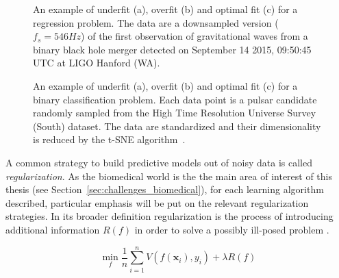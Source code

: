     \begin{figure}[!h]
    	\centering
        \hfill%
    	\caption{An example of underfit (a), overfit (b) and optimal fit (c) for a regression problem. The data are a downsampled version ($f_s = 546 Hz$) of the first observation of gravitational waves from a binary black hole merger detected on September 14 2015, 09:50:45 UTC at LIGO Hanford (WA).}\label{fig:regression_fit}
    \end{figure}

    \begin{figure}[!h]
	\centering
	\hfill%
	\caption{An example of underfit (a), overfit (b) and optimal fit (c) for a binary classification problem. Each data point is a pulsar candidate randomly sampled from the High Time Resolution Universe Survey (South) dataset. The data are standardized and their dimensionality is reduced by the t-SNE algorithm~\cite{van2008visualizing}. }\label{fig:classification_fit}
\end{figure}


    A common strategy to build predictive models out of noisy data is called \textit{regularization}. As the biomedical world is the the main area of interest of this thesis (see Section~\ref{sec:challenges_biomedical}), for each learning algorithm described, particular emphasis will be put on the relevant regularization strategies.
    In its broader definition regularization is the process of introducing additional information $R(f)$ in order to solve a possibly ill-posed problem \cite{tikhonov1963solution, evgeniou2000regularization}. 

     \begin{equation}\label{eq:losspen}
    	\min_f \frac{1}{n}\sum_{i=1}^n V(f(\bm{x}_i),y_i) + \lambda R(f)
    \end{equation}


